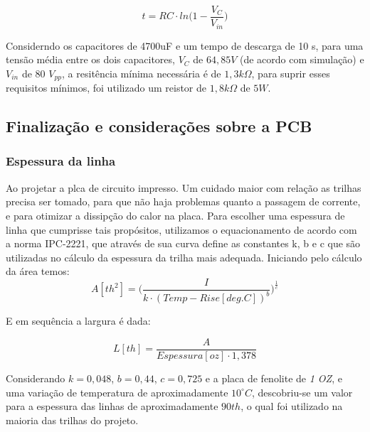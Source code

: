\documentclass[a4paper,12pt,oneside,openany,table,xcdraw]{article}
\begin{document}
\begin{equation}
t= RC \cdot ln\bigg( 1 - \frac{V_{C}}{V_{in}} \bigg) 
\end{equation}

Considerndo os capacitores de 4700uF e um tempo de descarga de 10 s, para uma tensão média entre os dois capacitores, $V_{C}$ de $64,85 V$ (de acordo com simulação) e $V_{in}$ de 80 $V_{pp}$, a resitência mínima necessária é de $1,3 k\Omega$, para suprir esses requisitos mínimos, foi utilizado um reistor de $1,8 k\Omega$ de $5W$. 


\subsection{Finalização e considerações sobre a PCB}

\subsubsection{Espessura da linha}
Ao projetar a plca de circuito impresso. Um cuidado maior com relação as trilhas precisa ser tomado, para que não haja problemas quanto a passagem de corrente, e para otimizar a dissipção do calor na placa. 
Para escolher uma espessura de linha que cumprisse tais propósitos, utilizamos o equacionamento de acordo com a norma IPC-2221, que através de sua curva define as constantes k, b e c que são utilizadas no cálculo da espessura da trilha mais adequada.
Iniciando pelo cálculo da área temos:
\begin{equation}
A [\mathit{th^{2}}] = \Bigg(\dfrac{I}{k \cdot (Temp-Rise [deg. C])^{b}}\Bigg)^{\frac{1}{c}}
 \end{equation}
 \vspace{0.3cm}

E em sequência a largura é dada:

\begin{equation}
L [\mathit{th}] = \dfrac{A}{Espessura [oz] \cdot 1,378}
 \end{equation}
\vspace{0.3cm}

Considerando  $k = 0,048$, $b = 0,44$, $c = 0,725$ e a placa de fenolite de \emph{1 OZ}, e uma variação de temperatura de aproximadamente $10^{\circ}C$, descobriu-se um valor para a espessura das linhas de aproximadamente $90 th$, o qual foi utilizado na maioria das trilhas do projeto.

\vspace{0.2cm}
\end{document}
